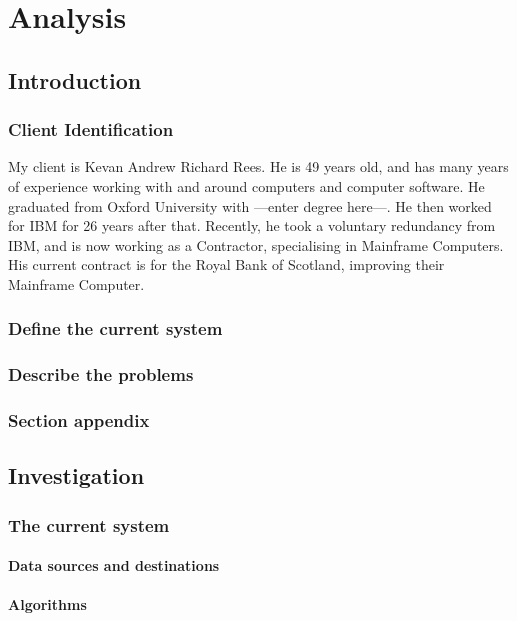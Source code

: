 \chapter{Analysis}

\section{Introduction}

\subsection{Client Identification}
My client is Kevan Andrew Richard Rees. He is 49 years old, and has many years of experience working with and around computers and computer software. He graduated from Oxford University with ---enter degree here---. He then worked for IBM for 26 years after that. 
Recently, he took a voluntary redundancy from IBM, and is now working as a Contractor, specialising in Mainframe Computers. His current contract is for the Royal Bank of Scotland, improving their Mainframe Computer.
\subsection{Define the current system}
	
\subsection{Describe the problems}

\subsection{Section appendix}

\section{Investigation}

\subsection{The current system}

\subsubsection{Data sources and destinations}

\subsubsection{Algorithms}

